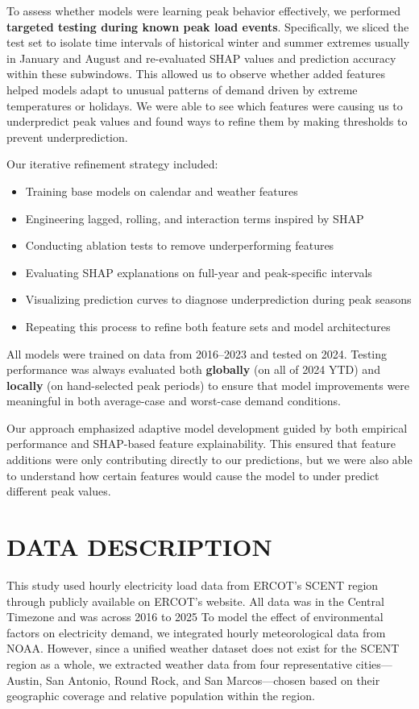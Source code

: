 \documentclass{ifacconf}
\begin{document}
To assess whether models were learning peak behavior effectively, we performed \textbf{targeted testing during known peak load events}. Specifically, we sliced the test set to isolate time intervals of historical winter and summer extremes usually in January and August and re-evaluated SHAP values and prediction accuracy within these subwindows. This allowed us to observe whether added features helped models adapt to unusual patterns of demand driven by extreme temperatures or holidays. We were able to see which features were causing us to underpredict peak values and found ways to refine them by making thresholds to prevent underprediction.

Our iterative refinement strategy included:
\begin{itemize}
    \item Training base models on  calendar and weather features
    \item Engineering lagged, rolling, and interaction terms inspired by SHAP
    \item Conducting ablation tests to remove underperforming features
    \item Evaluating SHAP explanations on full-year and peak-specific intervals
    \item Visualizing prediction curves to diagnose underprediction during peak seasons
    \item Repeating this process to refine both feature sets and model architectures
\end{itemize}

All models were trained on data from 2016--2023 and tested on 2024. Testing performance was always evaluated both \textbf{globally} (on all of 2024 YTD) and \textbf{locally} (on hand-selected peak periods) to ensure that model improvements were meaningful in both average-case and worst-case demand conditions.

 Our approach emphasized adaptive model development guided by both empirical performance and SHAP-based feature explainability. This ensured that feature additions were only contributing directly to our predictions, but we were also able to understand how certain features would cause the model to under predict different peak values.

\section{DATA DESCRIPTION}

This study used hourly electricity load data from ERCOT’s SCENT region through publicly available on ERCOT's website. All data was in the Central Timezone and was across 2016 to 2025 To model the effect of environmental factors on electricity demand, we integrated hourly meteorological data from NOAA. However, since a unified weather dataset does not exist for the SCENT region as a whole, we extracted weather data from four representative cities—Austin, San Antonio, Round Rock, and San Marcos—chosen based on their geographic coverage and relative population within the region.
\end{document}
